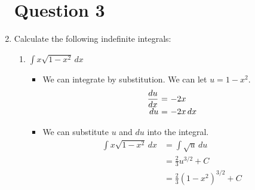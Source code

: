 \documentclass[12pt]{article}
\begin{document}
\begin{enumerate}[leftmargin=\labelsep]
    \newpage

    \section*{Question 3}

    \item Calculate the following indefinite integrals:
    \begin{enumerate}
        \item $\displaystyle{\int x \sqrt{1-x^2} \, dx}$
        \begin{itemize}[label={}]
            \item We can integrate by substitution. We can let $u = 1-x^2$.
            \begin{equation*}
                \begin{array}{r@{~=~}l}
                    \displaystyle{\frac{du}{dx}} & \displaystyle{-2x} \\
                    \displaystyle{du} & \displaystyle{-2x \, dx} \\
                \end{array}
            \end{equation*}
            \item We can substitute $u$ and $du$ into the integral.
            \begin{equation*}
                \begin{split}
                    \int x \sqrt{1-x^2} \, dx &= \int \sqrt{u} \, du \\
                    &= \frac{2}{3} u^{3/2} + C \\
                    &= \frac{2}{3} (1-x^2)^{3/2} + C \\
                \end{split}
            \end{equation*}
        \end{itemize}


\end{enumerate}
\end{enumerate}
\end{document}

